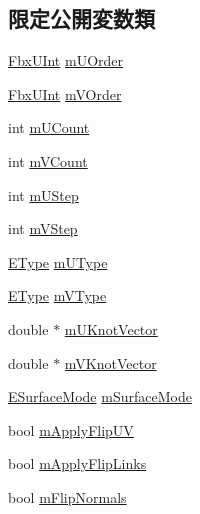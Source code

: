 \subsection*{限定公開変数類}
\begin{DoxyCompactItemize}
\item 
\hyperlink{fbxtypes_8h_ae9fb141d8158a730aa85ec5ff2ea3f6b}{Fbx\+U\+Int} \hyperlink{class_fbx_nurbs_surface_a3d90255b2201b059d204f71e5b9b0425}{m\+U\+Order}
\item 
\hyperlink{fbxtypes_8h_ae9fb141d8158a730aa85ec5ff2ea3f6b}{Fbx\+U\+Int} \hyperlink{class_fbx_nurbs_surface_ada5ba08a59866a76ccbfc80703393d3d}{m\+V\+Order}
\item 
int \hyperlink{class_fbx_nurbs_surface_a05d70185fbaf22e3af5ef7fd17d73b42}{m\+U\+Count}
\item 
int \hyperlink{class_fbx_nurbs_surface_a40b8ff01d4553096e11d5ccb2b6b1287}{m\+V\+Count}
\item 
int \hyperlink{class_fbx_nurbs_surface_acec8a3a1daf017807a0d92d5a0870d8e}{m\+U\+Step}
\item 
int \hyperlink{class_fbx_nurbs_surface_a3b9b47f98eb0a4177366c172e32adea5}{m\+V\+Step}
\item 
\hyperlink{class_fbx_nurbs_surface_a87c1fcd98d8fa511ee6c6166346a46b3}{E\+Type} \hyperlink{class_fbx_nurbs_surface_ac78cba1e37f750c5b39b188ee17271c1}{m\+U\+Type}
\item 
\hyperlink{class_fbx_nurbs_surface_a87c1fcd98d8fa511ee6c6166346a46b3}{E\+Type} \hyperlink{class_fbx_nurbs_surface_a2c836673f55f882dcdc6a86dbac716c0}{m\+V\+Type}
\item 
double $\ast$ \hyperlink{class_fbx_nurbs_surface_a76da3fcd1b4e3e97e4ab51a369b77e45}{m\+U\+Knot\+Vector}
\item 
double $\ast$ \hyperlink{class_fbx_nurbs_surface_a88a73fa5266add98b94c22ae4275a643}{m\+V\+Knot\+Vector}
\item 
\hyperlink{class_fbx_geometry_adb9d2e34481a2cb40f1d783c665794db}{E\+Surface\+Mode} \hyperlink{class_fbx_nurbs_surface_aa7b11f81e18ec46fcb2a506914912796}{m\+Surface\+Mode}
\item 
bool \hyperlink{class_fbx_nurbs_surface_a2459bfe7936b94eb90f6b0d0e8129bb8}{m\+Apply\+Flip\+UV}
\item 
bool \hyperlink{class_fbx_nurbs_surface_ab3198f7b659f5d63919b09624858a1ae}{m\+Apply\+Flip\+Links}
\item 
bool \hyperlink{class_fbx_nurbs_surface_a08318cf3444aa69fe72a3173d633ef13}{m\+Flip\+Normals}
\end{DoxyCompactItemize}
